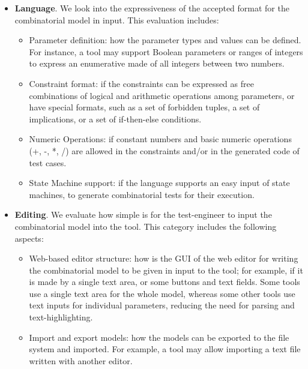 \begin{tikzborder}{\cite{Gargantini16:validation}}
\begin{tikzborder}{\cite{gargantini_combinatorial_2017}}
\begin{tikzborder}{\cite{garn2019}}
\begin{tikzborder}{\cite{arcaini2019achieving}}
\begin{tikzborder}{}
\begin{itemize}
	\item \textbf{Language}. We look into the expressiveness of the accepted format for the combinatorial model in input. This evaluation includes:
	\begin{itemize}
		\item Parameter definition: how the parameter types and values  can be defined. For instance, a tool may support Boolean parameters or ranges of integers to express an enumerative made of all integers between two numbers.
		\item Constraint format: if the constraints can be expressed as free combinations of logical and arithmetic operations among parameters, or have special formats, such as a set of forbidden tuples, a set of implications, or a set of if-then-else conditions. 
		\item Numeric Operations: if constant numbers and basic numeric operations (+, -, *, /) are allowed in the constraints and/or in the generated code of test cases.
		\item State Machine support: if the language supports an easy input of state machines, to generate combinatorial tests for their execution.
	\end{itemize} 
	\item \textbf{Editing}. We evaluate how simple is for the test-engineer to input the combinatorial model into the tool. This category includes the following aspects:
	\begin{itemize}
		\item Web-based editor structure: how is the GUI of the web editor for writing the combinatorial model to be given in input to the tool; for example, if it is made by a single text area, or some buttons and text fields. Some tools use a single text area for the whole model, whereas some other tools use text inputs for individual parameters, reducing the need for parsing and text-highlighting.
		
		\item Import and export models: how the models can be exported to the file system and imported. For example, a tool may allow importing a text file written with another editor.
		

\end{itemize}
\end{itemize}
\end{tikzborder}
\end{tikzborder}
\end{tikzborder}
\end{tikzborder}
\end{tikzborder}
